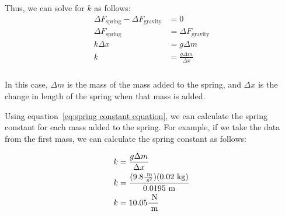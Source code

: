 \documentclass{article}
\begin{document}
            Thus, we can solve for $k$ as follows:
            \begin{equation}
                \begin{aligned}
                    \Delta F_{\text{spring}} - \Delta F_{\text{gravity}} &= 0 \\
                    \Delta F_{\text{spring}} &= \Delta F_{\text{gravity}} \\
                    k\Delta x &= g \Delta m \\
                    k &= \frac{g \Delta m}{\Delta x} \\
                \end{aligned}\label{eq:spring constant equation}
            \end{equation} \\
            
            In this case, $\Delta m$ is the mass of the mass added to the spring, and $\Delta x$ is the change in length of the spring when that mass is added.
            
            Using equation~\ref{eq:spring constant equation}, we can calculate the spring constant for each mass added to the spring.
            For example, if we take the data from the first mass, we can calculate the spring constant as follows:
            
            \begin{equation}
                \begin{aligned}
                    \notag
                    k &= \frac{g \Delta m}{\Delta x} \\
                    k &= \frac{(9.8 \frac{\text{ m}}{\text{ s}^2})(0.02 \text{ kg})}{0.0195 \text{ m}} \\
                    k &= 10.05 \frac{\text{ N}}{\text{ m}} \\
                \end{aligned}\label{eq:example spring constant equation}
            \end{equation}
            
\end{document}
